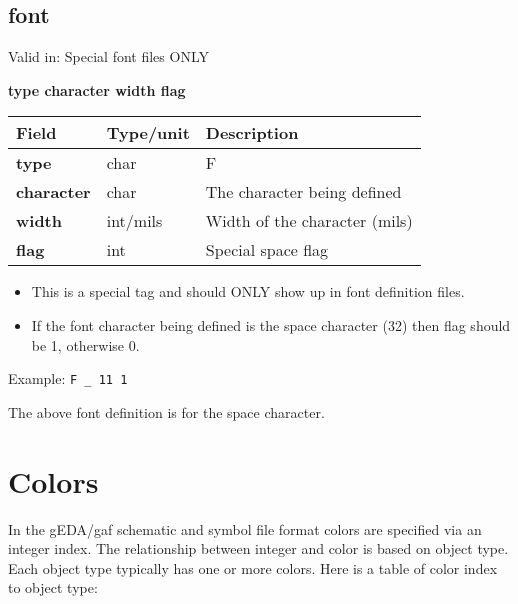 \documentclass{article}
\begin{document}
\subsection{font}

Valid in: Special font files ONLY

{\bf type character width flag}

\begin{table}[h]
\begin{tabular}{|l|l|l|} \hline
Field 		& Type/unit 	& Description \\ \hline 
\hline
{\bf type} 	& char 		& F \\ \hline
{\bf character} & char		& The character being defined \\ \hline
{\bf width} 	& int/mils	& Width of the character (mils)  \\ \hline
{\bf flag} 	& int		& Special space flag \\ \hline
\end{tabular}
\end{table}

\begin{itemize}
\item This is a special tag and should ONLY show up in font definition files.
\item If the font character being defined is the space character (32) then 
      flag should be 1, otherwise 0.
\end{itemize}


Example:\newline
{\tt F \_ 11 1}

The above font definition is for the space character.

\section{Colors}

In the gEDA/gaf schematic and symbol file format colors are specified via
an integer index.  The relationship between integer and color is based on
object type.  Each object type typically has one or more colors.  Here is 
a table of color index to object type:
\end{document}
